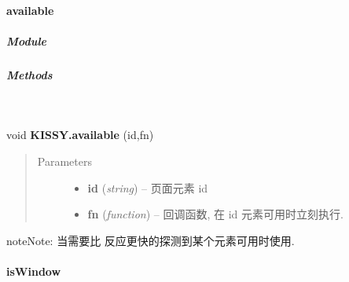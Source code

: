 \documentclass[letterpaper,10pt,english]{sphinxmanual}
\begin{document}
\paragraph{available}
\label{api/seed/web/available:available}\label{api/seed/web/available::doc}

\subparagraph{Module}
\label{api/seed/web/available:module}\begin{quote}

{\hyperref[api/seed/web/index:module-Web]{}}
\end{quote}


\subparagraph{Methods}
\label{api/seed/web/available:methods}

\begin{fulllineitems}
\label{api/seed/web/available:Web.KISSY.available}~
\begin{DUlineblock}{0em}
\item[] void \textbf{KISSY.available} (id,fn)
\end{DUlineblock}
\begin{quote}\begin{description}
\item[{Parameters}] \leavevmode\begin{itemize}
\item {}
\textbf{id} (\emph{string}) -- 页面元素 id

\item {}
\textbf{fn} (\emph{function}) -- 回调函数, 在 id 元素可用时立刻执行.

\end{itemize}

\end{description}\end{quote}

\begin{notice}{note}{Note:}
当需要比 {\hyperref[api/seed/web/ready:Web.KISSY.ready]{}} 反应更快的探测到某个元素可用时使用.
\end{notice}

\end{fulllineitems}



\paragraph{isWindow}
\label{api/seed/web/isWindow:iswindow}\label{api/seed/web/isWindow::doc}
\end{document}
